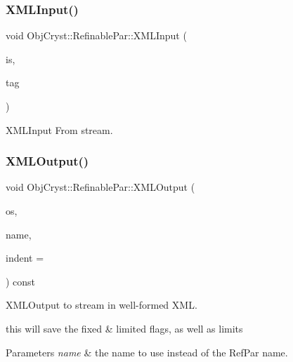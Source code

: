 \subsubsection{\texorpdfstring{XMLInput()}{XMLInput()}}
{\footnotesize\ttfamily void Obj\+Cryst\+::\+Refinable\+Par\+::\+X\+M\+L\+Input (\begin{DoxyParamCaption}\item[{istream \&}]{is,  }\item[{const \mbox{\hyperlink{class_obj_cryst_1_1_x_m_l_cryst_tag}{X\+M\+L\+Cryst\+Tag}} \&}]{tag }\end{DoxyParamCaption})}



X\+M\+L\+Input From stream. 

\mbox{\label{class_obj_cryst_1_1_refinable_par_a007ed9f9d3939b26f4620d77022008dd}} 
\subsubsection{\texorpdfstring{XMLOutput()}{XMLOutput()}\hspace{0.1cm}{\footnotesize\ttfamily [1/2]}}
{\footnotesize\ttfamily void Obj\+Cryst\+::\+Refinable\+Par\+::\+X\+M\+L\+Output (\begin{DoxyParamCaption}\item[{ostream \&}]{os,  }\item[{const string \&}]{name,  }\item[{int}]{indent = {} }\end{DoxyParamCaption}) const}



X\+M\+L\+Output to stream in well-\/formed X\+ML. 

this will save the fixed \& limited flags, as well as limits 
\begin{DoxyParams}{Parameters}
{\em name} & the name to use instead of the Ref\+Par name. \\
\hline
\end{DoxyParams}
\mbox{\label{class_obj_cryst_1_1_refinable_par_a2539f796654c2982b222b8056b04657f}} 
